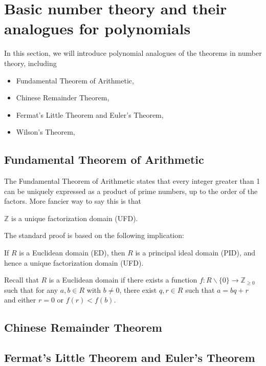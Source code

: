 \section{Basic number theory and their analogues for polynomials}
\label{sec:basicnt}

In this section, we will introduce polynomial analogues of the theorems in number theory, including
\begin{itemize}
    \item Fundamental Theorem of Arithmetic,
    \item Chinese Remainder Theorem,
    \item Fermat's Little Theorem and Euler's Theorem,
    \item Wilson's Theorem,
\end{itemize}


\subsection{Fundamental Theorem of Arithmetic}
\label{subsec:basicnt_fta}

The Fundamental Theorem of Arithmetic states that every integer greater than 1 can be uniquely expressed as a product of prime numbers, up to the order of the factors.
More fancier way to say this is that

\begin{theorem}
    $\mathbb{Z}$ is a unique factorization domain (UFD).
\end{theorem}
The standard proof is based on the following implication:
\begin{theorem}
    If $R$ is a Euclidean domain (ED), then $R$ is a principal ideal domain (PID), and hence a unique factorization domain (UFD).
\end{theorem}
Recall that $R$ is a Euclidean domain if there exists a function $f : R \backslash \{0\} \to \mathbb{Z}_{\geq 0}$ such that for any $a, b \in R$ with $b \neq 0$, there exist $q, r \in R$ such that $a = bq + r$ and either $r = 0$ or $f(r) < f(b)$.


\subsection{Chinese Remainder Theorem}
\label{subsec:basicnt_crt}


\subsection{Fermat's Little Theorem and Euler's Theorem}
\label{subsec:basicnt_flittlet}

